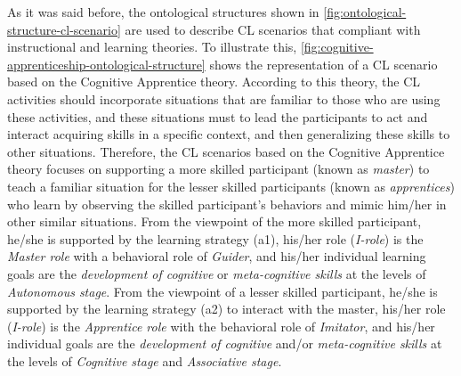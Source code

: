 As it was said before, the ontological structures shown in \autoref{fig:ontological-structure-cl-scenario} are used to describe CL scenarios that compliant with instructional and learning theories. To illustrate this, \autoref{fig:cognitive-apprenticeship-ontological-structure} shows the representation of a CL scenario based on the Cognitive Apprentice theory. According to this theory, the CL activities should incorporate situations that are familiar to those who are using these activities, and these situations must to lead the participants to act and interact acquiring skills in a specific context, and then generalizing these skills to other situations. Therefore, the CL scenarios based on the Cognitive Apprentice theory focuses on supporting a more skilled participant (known as \emph{master}) to teach a familiar situation for the lesser skilled participants (known as \emph{apprentices}) who learn by observing the skilled participant's behaviors and mimic him/her in other similar situations. From the viewpoint of the more skilled participant, he/she is supported by the learning strategy  (a1), his/her role (\emph{I-role}) is the \emph{Master role} with a behavioral role of \emph{Guider}, and his/her individual learning goals are the \emph{development of cognitive} or \emph{meta-cognitive skills} at the levels of \emph{Autonomous stage}. From the viewpoint of a lesser skilled participant, he/she is supported by the learning strategy  (a2) to interact with the master, his/her role (\emph{I-role}) is the \emph{Apprentice role} with the behavioral role of \emph{Imitator}, and his/her individual goals are the \emph{development of cognitive} and/or \emph{meta-cognitive skills} at the levels of \emph{Cognitive stage} and \emph{Associative stage}.

